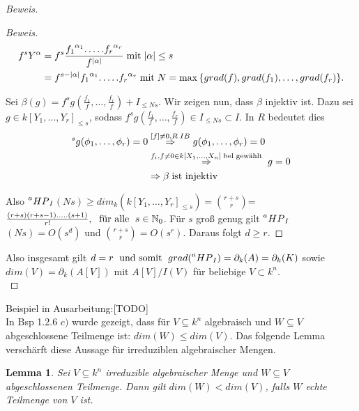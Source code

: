 \documentclass{article}
\newtheorem{lemma}[satz]{Lemma}
\newcommand*{\R}{k[X_{1},\ldots,X_{n}]}
\newcommand*{\indx}[2]{{#1}_{#2}}
\newcommand*{\potx}[2]{{#1}^{#2}}
\newcommand*{\N}{\mathbb{N}_0}
\newcommand*{\hp}[1]{$\prescript{a}{}{HP}_{#1}$}
\begin{document}
\begin{proof}[Beweis]
\begin{compactenum}
\begin{proof}[Beweis]
			\begin{align*}
			\potx{f}{s}\potx{Y}{\alpha}&=\potx{f}{s}\frac{\potx{\indx{f}{1}}{\indx{\alpha}{1}}.\ldots.\potx{\indx{f}{r}}{\indx{\alpha}{r}}}{\potx{f}{|\alpha|}}\; \textnormal{mit}\; |\alpha|\leq s\\&
			=\potx{f}{s-|\alpha|}\potx{\indx{f}{1}}{\indx{\alpha}{1}}.\ldots.\potx{\indx{f}{r}}{\indx{\alpha}{r}} \; \textnormal{mit}\; N=\max{\{grad(f),grad(\indx{f}{1}),\ldots,grad(\indx{f}{r})\}}.
			\end{align*}
			
		Sei $\beta(g)=\potx{f}{s}g(\frac{\indx{f}{1}}{f},\ldots,\frac{\indx{f}{r}}{f})+\indx{I}{\leq Ns}$. Wir zeigen nun, dass $\beta$ injektiv ist. Dazu sei $g\in \indx{k[\indx{Y}{1},\ldots,\indx{Y}{r}]}{\leq s}$, sodass $\potx{f}{s}g(\frac{\indx{f}{1}}{f},\ldots,\frac{\indx{f}{r}}{f})\in\indx{I}{\leq Ns}\subset I$. In $R$ bedeutet dies
		\begin{align*}
		[f]^sg(\indx{\phi}{1},\ldots,\indx{\phi}{r})=0&\stackrel{[f]\neq0,R\;IB}{\Rightarrow} g(\indx{\phi}{1},\ldots,\indx{\phi}{r})=0\\&
		\stackrel{\indx{f}{i},f\neq0 \in \R \;\textnormal{bel gewählt}}{\Rightarrow}\;  g=0\\&
		\Rightarrow \beta\;\textnormal{ist injektiv}
		\end{align*} 
		
		Also \hp{I}$(Ns)\geq \indx{dim}{k}(\indx{k[\indx{Y}{1},\ldots,\indx{Y}{r}]}{\leq s})=\binom{r+s}{r}$=$\frac{(r+s)(r+s-1).\ldots.(s+1)}{r!},\; \textnormal{ für alle } \; s\in \N$. Für $s$ groß genug gilt \hp{I}$(Ns)=O(s^d)$ und $\binom{r+s}{r}=O(s^r)$. Daraus folgt $d\geq r$.
		\end{proof}
	\end{compactenum}
Also insgesamt gilt $d=r\; \textnormal{ und somit } \; grad (\textnormal{\hp{I}})=\indx{\partial}{k}(A)=\indx{\partial}{k}(K)$ sowie $dim(V)= \indx{\partial}{k}(A[V])$ mit $A[V]/I(V)$ für beliebige $V\subset k^n$.\\
\end{proof}
Beispiel in Ausarbeitung:[TODO]\\

In Bsp 1.2.6 $c)$ wurde gezeigt, dass für $V\subseteq k^n$ algebraisch und $W\subseteq V$ abgeschlossene Teilmenge ist: $dim(W)\leq dim(V)$. Das folgende Lemma verschärft diese Aussage für irreduziblen algebraischer Mengen.

\begin{lemma}
	Sei $V\subseteq k^n$ irreduzible algebraischer Menge und $W\subseteq V$ abgeschlossenen Teilmenge. Dann gilt $dim(W)<dim(V)$, falls $W$ echte Teilmenge von $V$ ist.
\end{lemma} 
\end{document}
